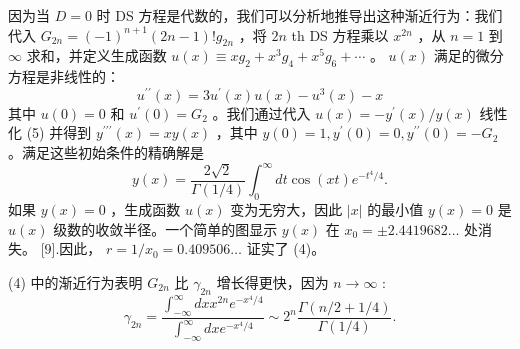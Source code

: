 \documentclass[UTF8]{article}
\begin{document}
因为当  $D=0$  时 DS 方程是代数的，我们可以分析地推导出这种渐近行为：我们代入  $G_{2 n}=(-1)^{n+1}(2 n-1) ! g_{2 n}$  ，将  $2 n$  th DS 方程乘以  $x^{2 n}$  ，从  $n=1$  到  $\infty$  求和，并定义生成函数  $u(x) \equiv x g_2+x^3 g_4+x^5 g_6+\cdots$  。  $u(x)$  满足的微分方程是非线性的：  $$u^{\prime \prime}(x)=3 u^{\prime}(x) u(x)-u^3(x)-x
$$  其中  $u(0)=0$  和  $u^{\prime}(0)=G_2$  。我们通过代入  $u(x)=-y^{\prime}(x) / y(x)$  线性化 (5) 并得到  $y^{\prime \prime \prime}(x)=x y(x)$  ，其中  $y(0)=1, y^{\prime}(0)=0, y^{\prime \prime}(0)=-G_2$  。满足这些初始条件的精确解是  $$y(x)=\frac{2 \sqrt{2}}{\Gamma(1 / 4)} \int_0^{\infty} d t \cos (x t) e^{-t^4 / 4} .
$$  如果  $y(x)=0$  ，生成函数  $u(x)$  变为无穷大，因此  $|x|$  的最小值  $y(x)=0$  是  $u(x)$  级数的收敛半径。一个简单的图显示  $y(x)$  在  $x_0= \pm 2.4419682 \ldots$  处消失。 [9].因此，  $r=1 / x_0=0.409506 \ldots$  证实了 (4)。

(4) 中的渐近行为表明  $G_{2 n}$  比  $\gamma_{2 n}$  增长得更快，因为  $n \rightarrow \infty$  :  $$
\gamma_{2 n}=\frac{\int_{-\infty}^{\infty} d x x^{2 n} e^{-x^4 / 4}}{\int_{-\infty}^{\infty} d x e^{-x^4 / 4}} \sim 2^n \frac{\Gamma(n / 2+1 / 4)}{\Gamma(1 / 4)} .
$$ 
\end{document}
